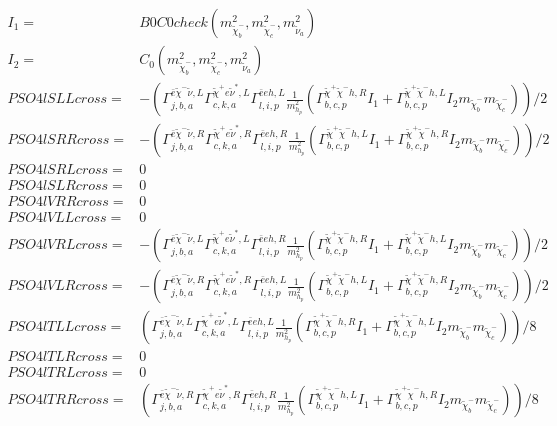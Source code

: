 \documentclass[A4,landscape]{article}
\begin{document}
\begin{align} 
I_1= & B0C0check(m^2_{\tilde{\chi}^-_{{b}}}, m^2_{\tilde{\chi}^-_{{c}}}, m^2_{\tilde{\nu}_{{a}}}) \\ 
I_2= & C_0(m^2_{\tilde{\chi}^-_{{b}}}, m^2_{\tilde{\chi}^-_{{c}}}, m^2_{\tilde{\nu}_{{a}}}) \\ 
  PSO4lSLLcross= & -( \Gamma^{\bar{e}\tilde{\chi}^- \tilde{\nu} ,L}_{j, b, a} \Gamma^{\tilde{\chi}^+e \tilde{\nu}^*,L}_{c, k, a} \Gamma^{\bar{e}e h ,L}_{l, i, p} \frac{1}{m^2_{h_{{p}}}} (\Gamma^{\tilde{\chi}^+\tilde{\chi}^- h ,R}_{b, c, p} I_1 + \Gamma^{\tilde{\chi}^+\tilde{\chi}^- h ,L}_{b, c, p} I_2 m_{\tilde{\chi}^-_{{b}}} m_{\tilde{\chi}^-_{{c}}}))/2 \\ 
  PSO4lSRRcross= & -( \Gamma^{\bar{e}\tilde{\chi}^- \tilde{\nu} ,R}_{j, b, a} \Gamma^{\tilde{\chi}^+e \tilde{\nu}^*,R}_{c, k, a} \Gamma^{\bar{e}e h ,R}_{l, i, p} \frac{1}{m^2_{h_{{p}}}} (\Gamma^{\tilde{\chi}^+\tilde{\chi}^- h ,L}_{b, c, p} I_1 + \Gamma^{\tilde{\chi}^+\tilde{\chi}^- h ,R}_{b, c, p} I_2 m_{\tilde{\chi}^-_{{b}}} m_{\tilde{\chi}^-_{{c}}}))/2 \\ 
  PSO4lSRLcross= & 0 \\ 
  PSO4lSLRcross= & 0 \\ 
  PSO4lVRRcross= & 0 \\ 
  PSO4lVLLcross= & 0 \\ 
  PSO4lVRLcross= & -( \Gamma^{\bar{e}\tilde{\chi}^- \tilde{\nu} ,L}_{j, b, a} \Gamma^{\tilde{\chi}^+e \tilde{\nu}^*,L}_{c, k, a} \Gamma^{\bar{e}e h ,R}_{l, i, p} \frac{1}{m^2_{h_{{p}}}} (\Gamma^{\tilde{\chi}^+\tilde{\chi}^- h ,R}_{b, c, p} I_1 + \Gamma^{\tilde{\chi}^+\tilde{\chi}^- h ,L}_{b, c, p} I_2 m_{\tilde{\chi}^-_{{b}}} m_{\tilde{\chi}^-_{{c}}}))/2 \\ 
  PSO4lVLRcross= & -( \Gamma^{\bar{e}\tilde{\chi}^- \tilde{\nu} ,R}_{j, b, a} \Gamma^{\tilde{\chi}^+e \tilde{\nu}^*,R}_{c, k, a} \Gamma^{\bar{e}e h ,L}_{l, i, p} \frac{1}{m^2_{h_{{p}}}} (\Gamma^{\tilde{\chi}^+\tilde{\chi}^- h ,L}_{b, c, p} I_1 + \Gamma^{\tilde{\chi}^+\tilde{\chi}^- h ,R}_{b, c, p} I_2 m_{\tilde{\chi}^-_{{b}}} m_{\tilde{\chi}^-_{{c}}}))/2 \\ 
  PSO4lTLLcross= & ( \Gamma^{\bar{e}\tilde{\chi}^- \tilde{\nu} ,L}_{j, b, a} \Gamma^{\tilde{\chi}^+e \tilde{\nu}^*,L}_{c, k, a} \Gamma^{\bar{e}e h ,L}_{l, i, p} \frac{1}{m^2_{h_{{p}}}} (\Gamma^{\tilde{\chi}^+\tilde{\chi}^- h ,R}_{b, c, p} I_1 + \Gamma^{\tilde{\chi}^+\tilde{\chi}^- h ,L}_{b, c, p} I_2 m_{\tilde{\chi}^-_{{b}}} m_{\tilde{\chi}^-_{{c}}}))/8 \\ 
  PSO4lTLRcross= & 0 \\ 
  PSO4lTRLcross= & 0 \\ 
  PSO4lTRRcross= & ( \Gamma^{\bar{e}\tilde{\chi}^- \tilde{\nu} ,R}_{j, b, a} \Gamma^{\tilde{\chi}^+e \tilde{\nu}^*,R}_{c, k, a} \Gamma^{\bar{e}e h ,R}_{l, i, p} \frac{1}{m^2_{h_{{p}}}} (\Gamma^{\tilde{\chi}^+\tilde{\chi}^- h ,L}_{b, c, p} I_1 + \Gamma^{\tilde{\chi}^+\tilde{\chi}^- h ,R}_{b, c, p} I_2 m_{\tilde{\chi}^-_{{b}}} m_{\tilde{\chi}^-_{{c}}}))/8 \\ 
\end{align} 
\end{document}
